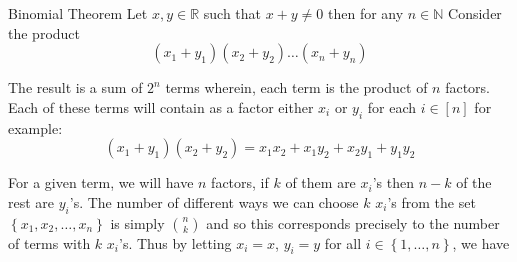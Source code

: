 \begin{theo*}{Binomial Theorem}
Let $x, y \in \mathbb{R}$ such that $x  +  y \neq 0$ then for any $n \in \mathbb{N}$                                                                      
Consider the product                                                                                                                                      
\[
\left( x_{1}  +  y_{1} \right) \left( x_{2}  +  y_{2} \right) \ldots \left( x_{n}  +  y_{n} \right)
\]
                                                                                                                                                          
The result is a sum of \(2^{n}\) terms wherein, each term is the product of \(n\) factors. Each of these terms will contain as a factor                   
either \(x_{i}\) or \(y_{i}\) for each \(i \in \left[ n \right]\) for                                                                                     example:                                                                                                                                                  
\[                                                                                                                                                        
\left( x_{1}  +  y_{1} \right)\left( x_{2} +  y_{2} \right) = x_{1}x_{2}  +  x_{1}y_{2}  +  x_{2}y_{1}  +  y_{1}y_{2}                                     
\]                                                                                                                                                        
                                                                                                                                                          
For a given term, we will have \(n\) factors, if \(k\) of them are \(x_{i}\)'s then \(n-k\) of the rest are \(y_{i}\)'s. The number of different ways we can choose \(k\) \(x_{i}\)'s from the set \(\left\{ x_{1}, x_{2}, \ldots, x_{n} \right\}\) is simply \(\binom{n}{k}\) and so this corresponds precisely to     the number of terms with \(k\) \(x_{i}\)'s. Thus by letting \(x_{i} = x\), \(y_{i} = y\) for all \(i \in \left\{ 1, \ldots, n \right\}\), we have
\end{theo*}




